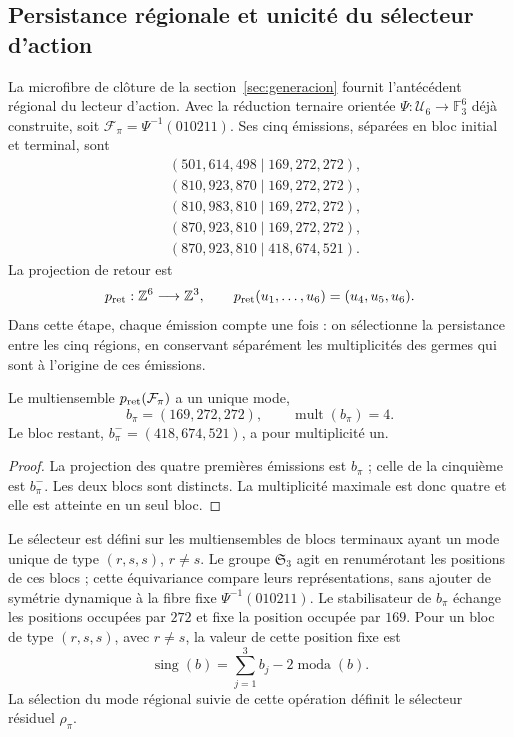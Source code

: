 \subsection{Persistance régionale et unicité du sélecteur d’action}
\label{sec:accion-selector-regional}

La microfibre de clôture de la section~\ref{sec:generacion} fournit
l’antécédent régional du lecteur d’action. Avec la réduction ternaire orientée
\(\Psi:\mathcal U_6\to\mathbb F_3^6\) déjà construite, soit
\(\mathcal F_\pi=\Psi^{-1}(010211)\). Ses cinq émissions, séparées
en bloc initial et terminal, sont
\[
\begin{aligned}
 &(501,614,498\mid169,272,272),\\
 &(810,923,870\mid169,272,272),\\
 &(810,983,810\mid169,272,272),\\
 &(870,923,810\mid169,272,272),\\
 &(870,923,810\mid418,674,521).
\end{aligned}
\]
La projection de retour est
\[
 p_{\rm ret}:\mathbb Z^6\longrightarrow\mathbb Z^3,
 \qquad p_{\rm ret}(u_1,\ldots,u_6)=(u_4,u_5,u_6).
\]
Dans cette étape, chaque émission compte une fois : on sélectionne la persistance
entre les cinq régions, en conservant séparément les multiplicités
des germes qui sont à l’origine de ces émissions.

\begin{proposition}
\label{prop:accion-bloque-persistente}
Le multiensemble \(p_{\rm ret}(\mathcal F_\pi)\) a un unique mode,
\[
 b_\pi=(169,272,272),\qquad \operatorname{mult}(b_\pi)=4.
\]
Le bloc restant, \(b_\pi^-=(418,674,521)\), a pour multiplicité un.
\end{proposition}
\begin{proof}
La projection des quatre premières émissions est \(b_\pi\) ; celle de la
cinquième est \(b_\pi^-\). Les deux blocs sont distincts. La multiplicité
maximale est donc quatre et elle est atteinte en un seul bloc.
\end{proof}

Le sélecteur est défini sur les multiensembles de blocs terminaux ayant un
mode unique de type \((r,s,s)\), \(r\ne s\). Le groupe
\(\mathfrak S_3\) agit en renumérotant les positions de ces blocs ;
cette équivariance compare leurs représentations, sans ajouter de symétrie
dynamique à la fibre fixe \(\Psi^{-1}(010211)\).
Le stabilisateur de \(b_\pi\) échange les positions occupées par
\(272\) et fixe la position occupée par \(169\). Pour un bloc de type
\((r,s,s)\), avec \(r\ne s\), la valeur de cette position fixe est
\[
 \operatorname{sing}(b)=\sum_{j=1}^3 b_j-2\operatorname{moda}(b).
\]
La sélection du mode régional suivie de cette opération définit le
sélecteur résiduel \(\rho_\pi\).

